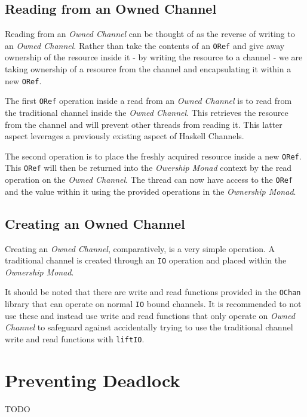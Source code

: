 \documentclass[onehalf,11pt]{beavtex}
\begin{document}
\subsection{Reading from an Owned Channel}

Reading from an \textit{Owned Channel} can be thought of as the reverse of
writing to an \textit{Owned Channel}.  Rather than take the contents of an
\texttt{ORef} and give away ownership of the resource inside it - by writing the
resource to a channel - we are taking ownership of a resource from the channel
and encapsulating it within a new \texttt{ORef}.

The first \texttt{ORef} operation inside a read from an \textit{Owned Channel}
is to read from the traditional channel inside the \textit{Owned Channel}. This
retrieves the resource from the channel and will prevent other threads from
reading it. This latter aspect leverages a previously existing aspect of
Haskell Channels. %

The second operation is to place the freshly acquired resource inside a new
\texttt{ORef}.  This \texttt{ORef} will then be returned into the
\textit{Owership Monad} context by the read operation on the
\textit{Owned Channel}.  The thread can now have access to the \texttt{ORef}
and the value within it using the provided operations in the
\textit{Ownership Monad}.


\subsection{Creating an Owned Channel}

Creating an \textit{Owned Channel}, comparatively, is a very simple operation.
A traditional channel is created through an \texttt{IO} operation and placed
within the \textit{Ownership Monad}.

It should be noted that there are write and read functions provided
in the \texttt{OChan} library that can operate on normal \texttt{IO} bound
channels.  It is recommended to not use these and instead use write and read
functions that only operate on \textit{Owned Channel} to safeguard against
accidentally trying to use the traditional channel write and read functions
with \texttt{liftIO}.


\section{Preventing Deadlock}
TODO
\end{document}
